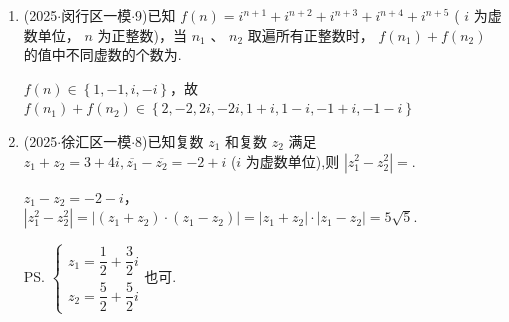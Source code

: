 \begin{enumerate}
    \item (2025$\cdot$闵行区一模$\cdot$9)已知 $f\left( n\right)  = {{i}}^{n + 1} + {{i}}^{n + 2} + {{i}}^{n + 3} + {{i}}^{n + 4} + {{i}}^{n + 5}$ ( ${i}$ 为虚数单位， $n$ 为正整数)，当 ${n}_{1}$ 、 ${n}_{2}$ 取遍所有正整数时， $f\left( {n}_{1}\right)  + f\left( {n}_{2}\right)$ 的值中不同虚数的个数为.
    \begin{jieda}
        $f(n) \in \left\{1,-1, i, -i\right\}$，故$f\left( {n}_{1}\right)  + f\left( {n}_{2}\right) \in \left\{2, -2, 2i, -2i,1+i, 1-i, -1+i, -1-i\right\}$
    \end{jieda}

    \item (2025$\cdot$徐汇区一模$\cdot$8)已知复数 ${z}_{1}$ 和复数 ${z}_{2}$ 满足 ${z}_{1} + {z}_{2} = 3 + 4{i},\overline{{z}_{1}} - \overline{{z}_{2}} =  -2 + {i}$ ($i$ 为虚数单位),则 $\left| {{z}_{1}^{2} - {z}_{2}^{2}}\right|  =$.
    \begin{jieda}
        $z_1 - z_2 = -2-i$，$\left| {{z}_{1}^{2} - {z}_{2}^{2}}\right|  = \left|(z_1+z_2) \cdot (z_1-z_2)\right| = \left|z_1+z_2\right| \cdot \left|z_1-z_2\right| = 5\sqrt{5}$.
        
        \ps $\left\{\begin{array}{l}
            z_1 = \dfrac{1}{2} + \dfrac{3}{2}i \\
            z_2 = \dfrac{5}{2} + \dfrac{5}{2}i
        \end{array}\right.$也可.
    \end{jieda}
\end{enumerate}

